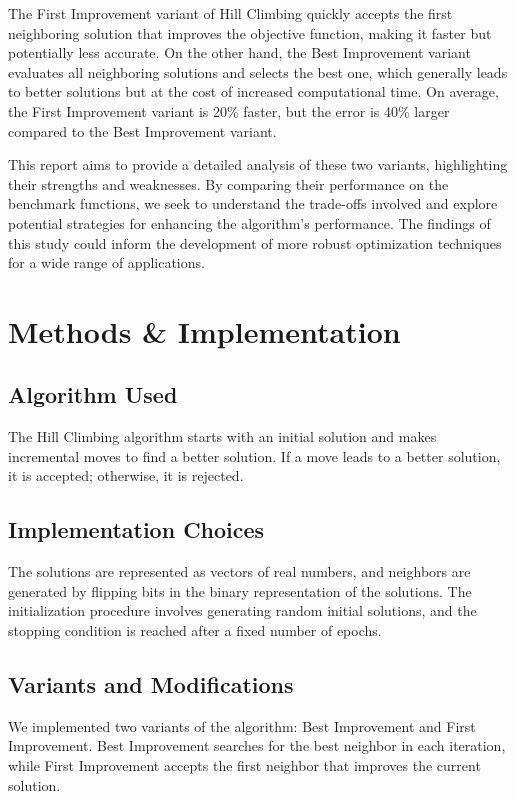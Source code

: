 \documentclass{article}
\begin{document}
The First Improvement variant of Hill Climbing quickly accepts the first neighboring solution that improves the objective function, making it faster but potentially less accurate. On the other hand, the Best Improvement variant evaluates all neighboring solutions and selects the best one, which generally leads to better solutions but at the cost of increased computational time. On average, the First Improvement variant is 20\% faster, but the error is 40\% larger compared to the Best Improvement variant.

This report aims to provide a detailed analysis of these two variants, highlighting their strengths and weaknesses. By comparing their performance on the benchmark functions, we seek to understand the trade-offs involved and explore potential strategies for enhancing the algorithm's performance. The findings of this study could inform the development of more robust optimization techniques for a wide range of applications.

\section{Methods \& Implementation}

\subsection{Algorithm Used}
The Hill Climbing algorithm starts with an initial solution and makes incremental moves to find a better solution. If a move leads to a better solution, it is accepted; otherwise, it is rejected.

\subsection{Implementation Choices}
The solutions are represented as vectors of real numbers, and neighbors are generated by flipping bits in the binary representation of the solutions. The initialization procedure involves generating random initial solutions, and the stopping condition is reached after a fixed number of epochs.

\subsection{Variants and Modifications}
We implemented two variants of the algorithm: Best Improvement and First Improvement. Best Improvement searches for the best neighbor in each iteration, while First Improvement accepts the first neighbor that improves the current solution.
\end{document}
